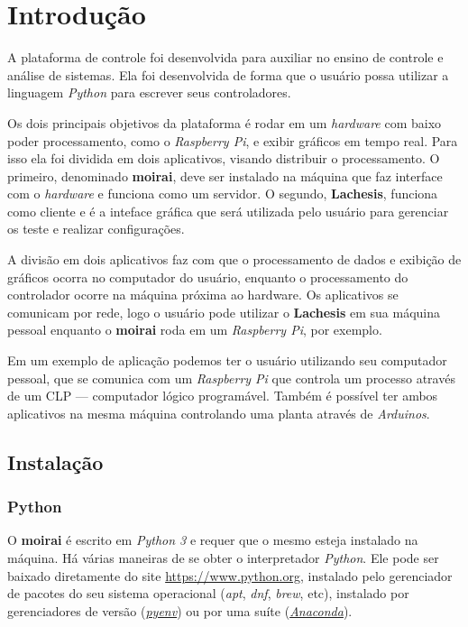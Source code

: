 
\chapter{Introdução}%
\label{chapter:introduction}

A plataforma de controle foi desenvolvida para auxiliar no ensino de controle e
análise de sistemas. Ela foi desenvolvida de forma que o usuário possa
utilizar a linguagem \textit{Python} para escrever seus controladores.

Os dois principais objetivos da plataforma é rodar em um \textit{hardware} com
baixo poder processamento, como o \textit{Raspberry Pi}, e exibir gráficos em
tempo real. Para isso ela foi dividida em dois aplicativos, visando distribuir o
processamento. O primeiro, denominado \textbf{moirai}, deve ser instalado na
máquina que faz interface com o \textit{hardware} e funciona como um servidor. O
segundo, \textbf{Lachesis}, funciona como cliente e é a inteface gráfica que
será utilizada pelo usuário para gerenciar os teste e realizar configurações.

A divisão em dois aplicativos faz com que o processamento de dados e exibição de
gráficos ocorra no computador do usuário, enquanto o processamento do
controlador ocorre na máquina próxima ao hardware. Os aplicativos se comunicam
por rede, logo o usuário pode utilizar o \textbf{Lachesis} em sua máquina
pessoal enquanto o \textbf{moirai} roda em um \textit{Raspberry Pi}, por
exemplo.

Em um exemplo de aplicação podemos ter o usuário utilizando seu computador
pessoal, que se comunica com um \textit{Raspberry Pi} que controla um processo
através de um CLP --- computador lógico programável. Também é possível ter ambos
aplicativos na mesma máquina controlando uma planta através de
\textit{Arduinos}.

\section{Instalação}%
\label{sec:installation}

\subsection{Python}%
\label{subsec:install-python}

O \textbf{moirai} é escrito em \textit{Python 3} e requer que o mesmo esteja
instalado na máquina. Há várias maneiras de se obter o interpretador
\textit{Python}. Ele pode ser baixado diretamente do site
\url{https://www.python.org}, instalado pelo gerenciador de pacotes do seu
sistema operacional (\textit{apt}, \textit{dnf}, \textit{brew}, etc), instalado
por gerenciadores de versão
(\href{https://github.com/pyenv/pyenv}{\textit{pyenv}}) ou por uma suíte
(\href{https://www.continuum.io/downloads}{\textit{Anaconda}}).

